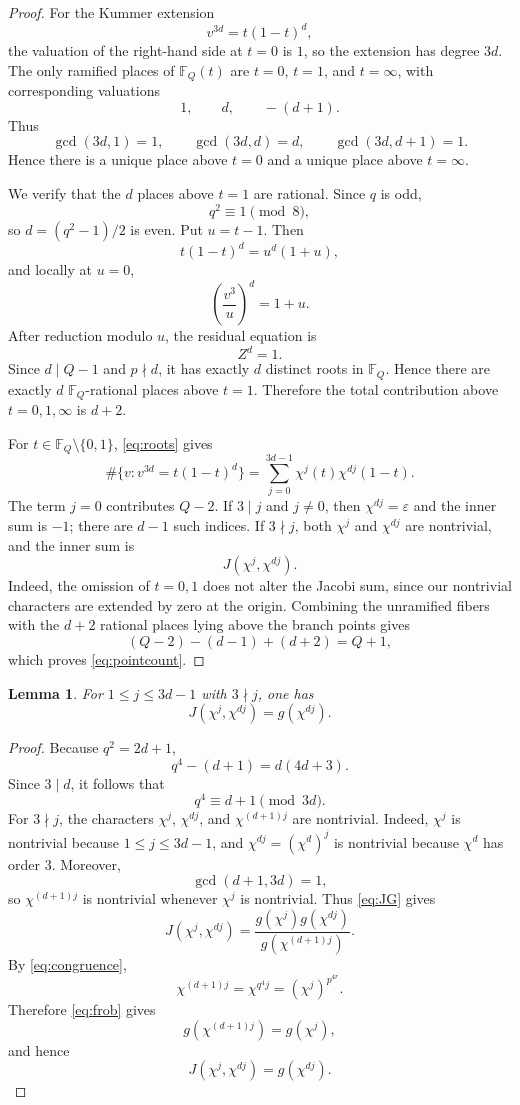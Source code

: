 \documentclass[3p,10pt]{elsarticle}
\newtheorem{lemma}[theorem]{Lemma}
\theoremstyle{remark}
\newcommand{\F}{\mathbb{F}}
\begin{document}
\begin{proof}
For the Kummer extension
\[
v^{3d}=t(1-t)^d,
\]
the valuation of the right-hand side at $t=0$ is $1$, so the extension has degree $3d$. The only ramified places of $\F_Q(t)$ are $t=0$, $t=1$, and $t=\infty$, with corresponding valuations
\[
1,\qquad d,\qquad -(d+1).
\]
Thus
\[
\gcd(3d,1)=1,
\qquad
\gcd(3d,d)=d,
\qquad
\gcd(3d,d+1)=1.
\]
Hence there is a unique place above $t=0$ and a unique place above $t=\infty$.

We verify that the $d$ places above $t=1$ are rational. Since $q$ is odd,
\[
q^2\equiv 1\pmod 8,
\]
so $d=(q^2-1)/2$ is even. Put $u=t-1$. Then
\[
t(1-t)^d=u^d(1+u),
\]
and locally at $u=0$,
\[
\left(\frac{v^3}{u}\right)^d=1+u.
\]
After reduction modulo $u$, the residual equation is
\[
Z^d=1.
\]
Since $d\mid Q-1$ and $p\nmid d$, it has exactly $d$ distinct roots in $\F_Q$. Hence there are exactly $d$ $\F_Q$-rational places above $t=1$. Therefore the total contribution above $t=0,1,\infty$ is $d+2$.

For $t\in\F_Q\setminus\{0,1\}$, \eqref{eq:roots} gives
\[
\#\{v:v^{3d}=t(1-t)^d\}
=
\sum_{j=0}^{3d-1}\chi^j(t)\chi^{dj}(1-t).
\]
The term $j=0$ contributes $Q-2$. If $3\mid j$ and $j\ne 0$, then $\chi^{dj}=\varepsilon$ and the inner sum is $-1$; there are $d-1$ such indices. If $3\nmid j$, both $\chi^j$ and $\chi^{dj}$ are nontrivial, and the inner sum is
\[
J(\chi^j,\chi^{dj}).
\]
Indeed, the omission of $t=0,1$ does not alter the Jacobi sum, since our nontrivial characters are extended by zero at the origin. Combining the unramified fibers with the $d+2$ rational places lying above the branch points gives
\[
(Q-2)-(d-1)+(d+2)=Q+1,
\]
which proves \eqref{eq:pointcount}.
\end{proof}

\begin{lemma}\label{lem:reduce}
For $1\le j\le 3d-1$ with $3\nmid j$, one has
\[
J(\chi^j,\chi^{dj})=g(\chi^{dj}).
\]
\end{lemma}

\begin{proof}
Because $q^2=2d+1$,
\[
q^4-(d+1)=d(4d+3).
\]
Since $3\mid d$, it follows that
\begin{equation}\label{eq:congruence}
q^4\equiv d+1\pmod{3d}.
\end{equation}
For $3\nmid j$, the characters $\chi^j$, $\chi^{dj}$, and $\chi^{(d+1)j}$ are nontrivial. Indeed, $\chi^j$ is nontrivial because $1\le j\le 3d-1$, and $\chi^{dj}=(\chi^d)^j$ is nontrivial because $\chi^d$ has order $3$. Moreover,
\[
\gcd(d+1,3d)=1,
\]
so $\chi^{(d+1)j}$ is nontrivial whenever $\chi^j$ is nontrivial. Thus \eqref{eq:JG} gives
\[
J(\chi^j,\chi^{dj})
=
\frac{g(\chi^j)g(\chi^{dj})}{g(\chi^{(d+1)j})}.
\]
By \eqref{eq:congruence},
\[
\chi^{(d+1)j}=\chi^{q^4j}=(\chi^j)^{p^{4r}}.
\]
Therefore \eqref{eq:frob} gives
\[
g(\chi^{(d+1)j})=g(\chi^j),
\]
and hence
\[
J(\chi^j,\chi^{dj})=g(\chi^{dj}).
\]
\end{proof}
\end{document}
